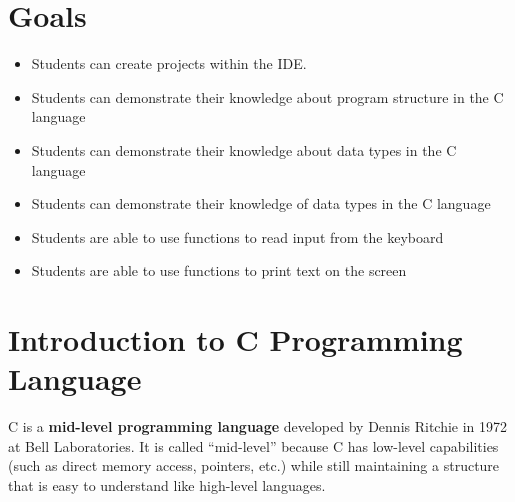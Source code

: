\section*{Goals}
\begin{itemize}[label=$\bullet$, itemsep=-1pt, leftmargin=*]
	\item Students can create projects within the IDE.
	\item Students can demonstrate their knowledge about program structure in the C language
	\item Students can demonstrate their knowledge about data types in the C language
	\item Students can demonstrate their knowledge of data types in the C language
	\item Students are able to use functions to read input from the keyboard
	\item Students are able to use functions to print text on the screen

\end{itemize}
\section*{Introduction to C Programming Language}

C is a \textbf{mid-level programming language} developed by Dennis Ritchie in 1972 at Bell Laboratories.  
It is called ``mid-level'' because C has low-level capabilities (such as direct memory access, pointers, etc.) while still maintaining a structure that is easy to understand like high-level languages.  

